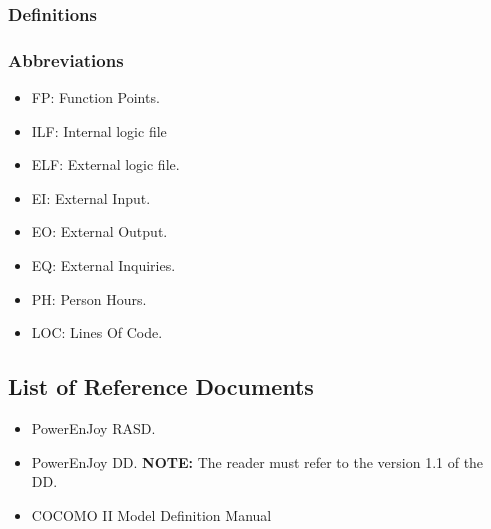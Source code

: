 \subsubsection{Definitions}

\subsubsection{Abbreviations}
\begin{itemize}
	\item  FP: Function Points.
	\item  ILF: Internal logic file
	\item  ELF: External logic file.
	\item  EI: External Input.
	\item  EO: External Output.
	\item  EQ: External Inquiries.
	\item PH: Person Hours.
	\item LOC: Lines Of Code.
\end{itemize}



\subsection{List of Reference Documents}
\begin{itemize}
	\item PowerEnJoy RASD.	
	\item PowerEnJoy DD.
	\textbf{NOTE:} The reader must refer to the version 1.1 of the DD.
	\item COCOMO II Model Definition Manual 
\end{itemize}

